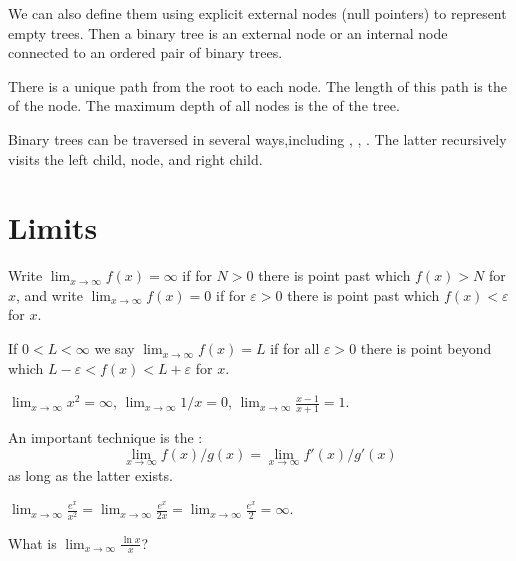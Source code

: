 We can also define them using explicit external nodes (null pointers) to represent empty trees. Then a binary tree is an external node or an internal node connected to an ordered pair of binary trees.

There is a unique path from the root to each node. The length of this path is the  of the node. The maximum depth of all nodes is the  of the tree.

Binary trees can be traversed in several ways,including , , . 
The latter recursively visits the left child, node, and right child.


\section{Limits}
Write $\lim_{x \to \infty} f(x) = \infty$ if for  $N>0$ there is  point past which $f(x) > N$ for  $x$, 
and write $\lim_{x\to\infty} f(x) = 0$ if for  $\varepsilon>0$ there is  point past which $f(x) < \varepsilon$ for  $x$.

If $0 < L < \infty$ we say $\lim_{x \to \infty} f(x) = L$ if for all $\varepsilon > 0$ there is  point 
beyond which $L - \varepsilon < f(x) < L + \varepsilon$ for  $x$.

\begin{Boxample}
$\lim_{x \to \infty} x^2 = \infty$, $\lim_{x \to \infty} 1/x = 0$, $\lim_{x\to \infty} \frac{x-1}{x+1} = 1$.
\end{Boxample}

An important technique is the : $$\lim_{x\to \infty} f(x)/g(x) = \lim_{x\to \infty} f'(x)/g'(x)$$ as long as the latter exists. 

\begin{Boxample}
$\lim_{x\to\infty} \frac{e^x}{x^2} =  \lim_{x\to\infty} \frac{e^x}{2x} = \lim_{x\to\infty} \frac{e^x}{2} = \infty$.
\end{Boxample}
 
\begin{Boxample}[5]
What is  $\lim_{x\to\infty} \frac{\ln x}{x}$?
\end{Boxample}



